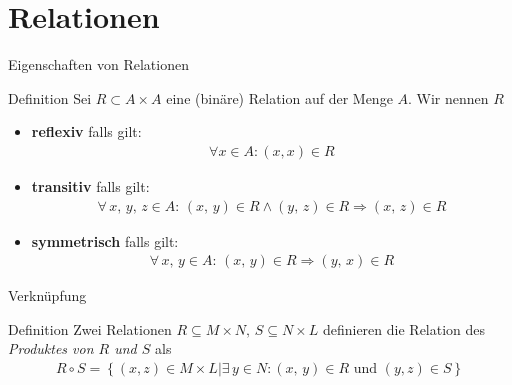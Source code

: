 \section{Relationen}
\begin{frame}{Eigenschaften von Relationen}
    \begin{block}{Definition}
        Sei $R \subset A \times A$ eine (binäre) Relation auf der Menge $A$. Wir nennen $R$
        \begin{itemize}
            \item \textbf{reflexiv} falls gilt:
                \begin{align*}
                    \forall x \in A: \left( x,x\right) \in R
                \end{align*}
            \item\textbf{transitiv} falls gilt:
                \begin{align*}
                    \forall\, x,\, y,\, z \in A:\,\left( x,\, y\right) \in R \wedge \left(y,\, z\right) \in R \Rightarrow \left( x,\, z\right) \in R
                \end{align*}
            \item \textbf{symmetrisch} falls gilt:
                \begin{align*}
                    \forall\, x,\, y \in A:\,\left( x,\, y\right) \in R \Rightarrow \left( y,\, x\right) \in R
                \end{align*}
        \end{itemize}
    \end{block}
\end{frame}
\begin{frame}{Verknüpfung}
    \begin{block}{Definition}
        Zwei Relationen $R\subseteq M \times N ,\, S\subseteq N\times L$ definieren die Relation des \emph{Produktes von $R$ und $S$} als
        \begin{align*}
            R \circ S = \left\{\left( x,z\right)\in M\times L | \exists\, y \in N :\left( x,\, y\right) \in R \text{ und } \left( y, z\right) \in S\right\}
        \end{align*}
    \end{block}
    \pause
\end{frame}



